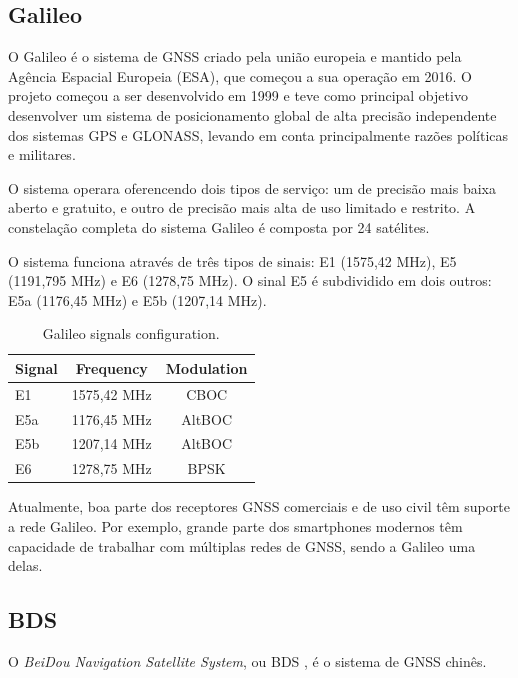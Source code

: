 \subsection{Galileo}

O Galileo é o sistema de GNSS criado pela união europeia e mantido pela Agência Espacial Europeia (ESA), que começou a sua operação em 2016. O projeto começou a ser desenvolvido em 1999 e teve como principal objetivo desenvolver um sistema de posicionamento global de alta precisão independente dos sistemas GPS e GLONASS, levando em conta principalmente razões políticas e militares.

O sistema operara oferencendo dois tipos de serviço: um de precisão mais baixa aberto e gratuito, e outro de precisão mais alta de uso limitado e restrito. A constelação completa do sistema Galileo é composta por 24 satélites.

O sistema funciona através de três tipos de sinais: E1 (1575,42 MHz), E5 (1191,795 MHz) e E6 (1278,75 MHz). O sinal E5 é subdividido em dois outros: E5a (1176,45 MHz) e E5b (1207,14 MHz).

\begin{table}[!h]
    \centering
    \begin{tabular}{lcc}
        \toprule[1.5pt]
        \textbf{Signal} & \textbf{Frequency} & \textbf{Modulation} \\
        \midrule
        E1  & 1575,42 MHz & CBOC \\
        E5a & 1176,45 MHz & AltBOC \\
        E5b & 1207,14 MHz & AltBOC \\
        E6  & 1278,75 MHz & BPSK \\
        \bottomrule[1.5pt]
    \end{tabular}
    \caption{Galileo signals configuration.}
    \label{tab:galileo-signals}
\end{table}

Atualmente, boa parte dos receptores GNSS comerciais e de uso civil têm suporte a rede Galileo. Por exemplo, grande parte dos smartphones modernos têm capacidade de trabalhar com múltiplas redes de GNSS, sendo a Galileo uma delas.

\subsection{BDS}

O \textit{BeiDou Navigation Satellite System}, ou BDS \cite{beidou}, é o sistema de GNSS chinês.

